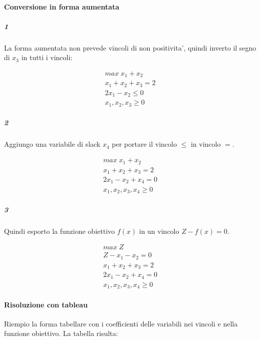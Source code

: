 \documentclass[a4paper,12pt,oneside]{article}
\begin{document}
    \paragraph{Conversione in forma aumentata}

    \subparagraph{1}

    La forma aumentata non prevede vincoli di non positivita', quindi inverto il segno di $x_3$ in tutti i vincoli:

    \begin{align}
        \text{$max \; x_1 + x_2$} \\
        \text{$x_1 + x_2 + x_3 = 2$} \\
        \text{$2 x_1 - x_2 \leq 0$} \\
        \text{$x_1, x_2, x_3 \geq 0$}
    \end{align}

    \subparagraph{2}

    Aggiungo una variabile di slack $x_4$ per portare il vincolo $\leq$ in vincolo $=$.

    \begin{align}
        \text{$max \; x_1 + x_2$} \\
        \text{$x_1 + x_2 + x_3 = 2$} \\
        \text{$2 x_1 - x_2 + x_4 = 0$} \\
        \text{$x_1, x_2, x_3, x_4 \geq 0$}
    \end{align}

    \subparagraph{3}

    Quindi esporto la funzione obiettivo $f(x)$ in un vincolo $Z - f(x) = 0$.

    \begin{align}
        \text{$max \; Z$} \\
        \text{$Z - x_1 - x_2 = 0$} \\
        \text{$x_1 + x_2 + x_3 = 2$} \\
        \text{$2 x_1 - x_2 + x_4 = 0$} \\
        \text{$x_1, x_2, x_3, x_4 \geq 0$}
     \end{align}

    \paragraph{Risoluzione con tableau}

    Riempio la forma tabellare con i coefficienti delle variabili nei vincoli e nella funzione obiettivo.
    La tabella risulta: \\
\end{document}
